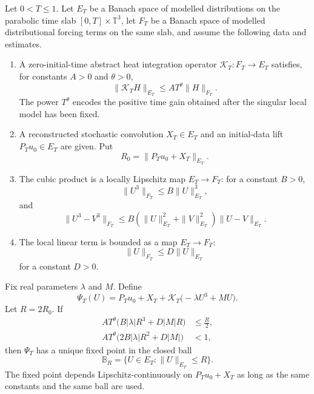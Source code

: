 \begin{theorem}
\label{thm:spde-abstract-modelled-fixed-point}
Let \(0<T\leq1\).  Let \(E_T\) be a Banach space of modelled distributions
on the parabolic time slab \([0,T]\times\mathbb T^3\), let \(F_T\) be a
Banach space of modelled distributional forcing terms on the same slab, and
assume the following data and estimates.
\begin{enumerate}[label=(\roman*)]
  \item A zero-initial-time abstract heat integration operator
  \(\mathcal K_T:F_T\to E_T\) satisfies, for constants \(A>0\) and
  \(\theta>0\),
  \begin{equation}
    \|\mathcal K_T H\|_{E_T}
    \leq
    A T^\theta \|H\|_{F_T}.
    \label{eq:spde-abstract-schauder-small-time}
  \end{equation}
  The power \(T^\theta\) encodes the positive time gain obtained after the
  singular local model has been fixed.
  \item A reconstructed stochastic convolution \(X_T\in E_T\) and an
  initial-data lift \(P_Tu_0\in E_T\) are given.  Put
  \[
    R_0=\|P_Tu_0+X_T\|_{E_T}.
  \]
  \item The cubic product is a locally Lipschitz map \(E_T\to F_T\):
  for a constant \(B>0\),
  \[
    \|U^3\|_{F_T}\leq B\|U\|_{E_T}^3,
  \]
  and
  \begin{equation}
    \|U^3-V^3\|_{F_T}
    \leq
    B(\|U\|_{E_T}^2+\|V\|_{E_T}^2)\|U-V\|_{E_T}.
    \label{eq:spde-cubic-modelled-lipschitz}
  \end{equation}
  \item The local linear term is bounded as a map \(E_T\to F_T\):
  \[
    \|U\|_{F_T}\leq D\|U\|_{E_T}
  \]
  for a constant \(D>0\).
\end{enumerate}
Fix real parameters \(\lambda\) and \(M\).  Define
\begin{equation}
  \Psi_T(U)
  =
  P_Tu_0+X_T
  +
  \mathcal K_T\bigl(-\lambda U^3+MU\bigr).
  \label{eq:spde-modelled-fixed-point-map}
\end{equation}
Let \(R=2R_0\).  If
\begin{align}
  A T^\theta\bigl(B|\lambda|R^3+D|M|R\bigr)
  &\leq \frac{R}{2},
  \label{eq:spde-fixed-point-ball-condition}\\
  A T^\theta\bigl(2B|\lambda|R^2+D|M|\bigr)
  &<1,
  \label{eq:spde-fixed-point-contraction-condition}
\end{align}
then \(\Psi_T\) has a unique fixed point in the closed ball
\[
  \mathbb B_R=\{U\in E_T:\|U\|_{E_T}\leq R\}.
\]
The fixed point depends Lipschitz-continuously on \(P_Tu_0+X_T\) as long as
the same constants and the same ball are used.
\end{theorem}

